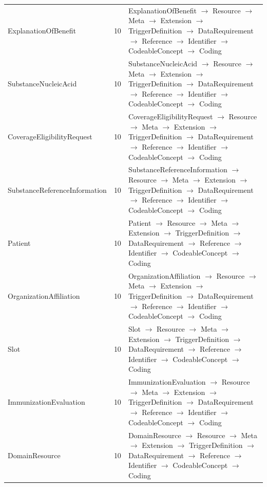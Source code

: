 \begin{longtable}{lrl}
ExplanationOfBenefit & 10 & ExplanationOfBenefit $\rightarrow$ Resource $\rightarrow$ Meta $\rightarrow$ Extension $\rightarrow$ TriggerDefinition $\rightarrow$ DataRequirement $\rightarrow$ Reference $\rightarrow$ Identifier $\rightarrow$ CodeableConcept $\rightarrow$ Coding \\
SubstanceNucleicAcid & 10 & SubstanceNucleicAcid $\rightarrow$ Resource $\rightarrow$ Meta $\rightarrow$ Extension $\rightarrow$ TriggerDefinition $\rightarrow$ DataRequirement $\rightarrow$ Reference $\rightarrow$ Identifier $\rightarrow$ CodeableConcept $\rightarrow$ Coding \\
CoverageEligibilityRequest & 10 & CoverageEligibilityRequest $\rightarrow$ Resource $\rightarrow$ Meta $\rightarrow$ Extension $\rightarrow$ TriggerDefinition $\rightarrow$ DataRequirement $\rightarrow$ Reference $\rightarrow$ Identifier $\rightarrow$ CodeableConcept $\rightarrow$ Coding \\
SubstanceReferenceInformation & 10 & SubstanceReferenceInformation $\rightarrow$ Resource $\rightarrow$ Meta $\rightarrow$ Extension $\rightarrow$ TriggerDefinition $\rightarrow$ DataRequirement $\rightarrow$ Reference $\rightarrow$ Identifier $\rightarrow$ CodeableConcept $\rightarrow$ Coding \\
Patient & 10 & Patient $\rightarrow$ Resource $\rightarrow$ Meta $\rightarrow$ Extension $\rightarrow$ TriggerDefinition $\rightarrow$ DataRequirement $\rightarrow$ Reference $\rightarrow$ Identifier $\rightarrow$ CodeableConcept $\rightarrow$ Coding \\
OrganizationAffiliation & 10 & OrganizationAffiliation $\rightarrow$ Resource $\rightarrow$ Meta $\rightarrow$ Extension $\rightarrow$ TriggerDefinition $\rightarrow$ DataRequirement $\rightarrow$ Reference $\rightarrow$ Identifier $\rightarrow$ CodeableConcept $\rightarrow$ Coding \\
Slot & 10 & Slot $\rightarrow$ Resource $\rightarrow$ Meta $\rightarrow$ Extension $\rightarrow$ TriggerDefinition $\rightarrow$ DataRequirement $\rightarrow$ Reference $\rightarrow$ Identifier $\rightarrow$ CodeableConcept $\rightarrow$ Coding \\
ImmunizationEvaluation & 10 & ImmunizationEvaluation $\rightarrow$ Resource $\rightarrow$ Meta $\rightarrow$ Extension $\rightarrow$ TriggerDefinition $\rightarrow$ DataRequirement $\rightarrow$ Reference $\rightarrow$ Identifier $\rightarrow$ CodeableConcept $\rightarrow$ Coding \\
DomainResource & 10 & DomainResource $\rightarrow$ Resource $\rightarrow$ Meta $\rightarrow$ Extension $\rightarrow$ TriggerDefinition $\rightarrow$ DataRequirement $\rightarrow$ Reference $\rightarrow$ Identifier $\rightarrow$ CodeableConcept $\rightarrow$ Coding \\

\end{longtable}
